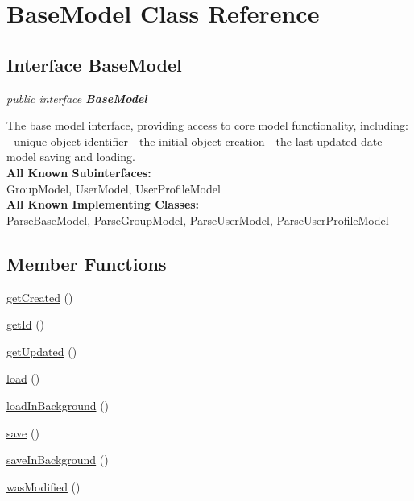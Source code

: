 \hypertarget{class_BaseModel.Android}{\section{BaseModel Class Reference}
\label{class_BaseModel.Android}
}

\subsection*{Interface BaseModel}

\textit{public interface \textbf{BaseModel}}

The base model interface, providing access to core model functionality, including: - unique object identifier - the initial object creation - the last updated date - model saving and loading.\\

\textbf{All Known Subinterfaces:}\\
\tab     GroupModel, UserModel, UserProfileModel\\

\textbf{All Known Implementing Classes:}\\
\tab        ParseBaseModel, ParseGroupModel, ParseUserModel, ParseUserProfileModel\\

\subsection*{Member Functions}
\begin{DoxyCompactItemize}
\item 
\hyperlink{class_BaseModel.Android.getCreated}{getCreated} ()
\item 
\hyperlink{class_BaseModel.Android.getId}{getId} ()
\item 
\hyperlink{class_BaseModel.Android.getUpdated}{getUpdated} ()
\item 
\hyperlink{class_BaseModel.Android.load}{load} ()
\item 
\hyperlink{class_BaseModel.Android.loadInBackground}{loadInBackground} ()
\item 
\hyperlink{class_BaseModel.Android.save}{save} ()
\item 
\hyperlink{class_BaseModel.Android.saveInBackground}{saveInBackground} ()
\item 
\hyperlink{class_BaseModel.Android.wasModified}{wasModified} ()

\end{DoxyCompactItemize}




